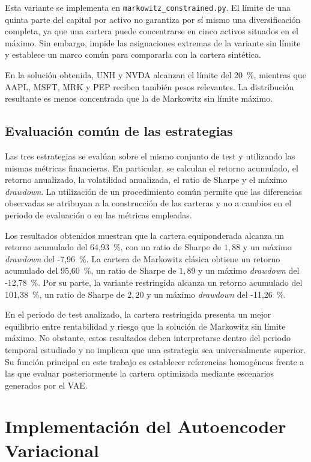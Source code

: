 Esta variante se implementa en \texttt{markowitz\_constrained.py}. El límite de una quinta parte del capital por activo no garantiza por sí mismo una diversificación completa, ya que una cartera puede concentrarse en cinco activos situados en el máximo. Sin embargo, impide las asignaciones extremas de la variante sin límite y establece un marco común para compararla con la cartera sintética.

En la solución obtenida, UNH y NVDA alcanzan el límite del 20~\%, mientras que AAPL, MSFT, MRK y PEP reciben también pesos relevantes. La distribución resultante es menos concentrada que la de Markowitz sin límite máximo.

\subsection{Evaluación común de las estrategias}

Las tres estrategias se evalúan sobre el mismo conjunto de test y utilizando las mismas métricas financieras. En particular, se calculan el retorno acumulado, el retorno anualizado, la volatilidad anualizada, el ratio de Sharpe y el máximo \textit{drawdown}. La utilización de un procedimiento común permite que las diferencias observadas se atribuyan a la construcción de las carteras y no a cambios en el periodo de evaluación o en las métricas empleadas.

Los resultados obtenidos muestran que la cartera equiponderada alcanza un retorno acumulado del 64,93~\%, con un ratio de Sharpe de \(1{,}88\) y un máximo \textit{drawdown} del -7,96~\%. La cartera de Markowitz clásica obtiene un retorno acumulado del 95,60~\%, un ratio de Sharpe de \(1{,}89\) y un máximo \textit{drawdown} del -12,78~\%. Por su parte, la variante restringida alcanza un retorno acumulado del 101,38~\%, un ratio de Sharpe de \(2{,}20\) y un máximo \textit{drawdown} del -11,26~\%.

En el periodo de test analizado, la cartera restringida presenta un mejor equilibrio entre rentabilidad y riesgo que la solución de Markowitz sin límite máximo. No obstante, estos resultados deben interpretarse dentro del periodo temporal estudiado y no implican que una estrategia sea universalmente superior. Su función principal en este trabajo es establecer referencias homogéneas frente a las que evaluar posteriormente la cartera optimizada mediante escenarios generados por el VAE.


\section{Implementación del Autoencoder Variacional}


